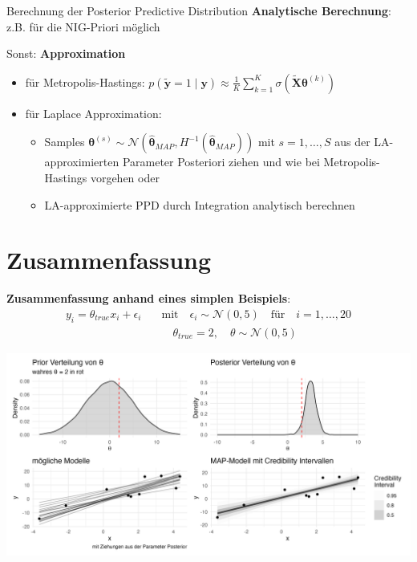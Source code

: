 \documentclass[
  ignorenonframetext,
  aspectratio=169,
]{beamer}
\providecommand{\tightlist}{%
  \setlength{\itemsep}{0pt}\setlength{\parskip}{0pt}}
\newcommand{\by}{\bm{y}}
\newcommand{\Ncal}{\mathcal{N}}
\newcommand{\btheta}{\bm{\theta}}
\newcommand{\hbtheta}{\hat{\bm{\theta}}}
\newcommand{\ty}{\tilde{\bm{y}}}
\newcommand{\tX}{\tilde{\bm{X}}}
\begin{document}
\begin{frame}{Berechnung der Posterior Predictive Distribution}
\protect{}\label{berechnung-der-posterior-predictive-distribution}
\textbf{Analytische Berechnung}: z.B. für die NIG-Priori möglich

Sonst: \textbf{Approximation}

\begin{itemize}
\tightlist
\item
  für Metropolis-Hastings:
  \(p(\ty = 1 \mid \by) \approx \frac{1}{K} \sum_{k=1}^{K} \sigma(\tX \btheta^{(k)})\)
\item
  für Laplace Approximation:

  \begin{itemize}
  \tightlist
  \item
    Samples
    \(\btheta^{(s)} \sim \Ncal(\hbtheta_{MAP}, H^{-1}(\hbtheta_{MAP}))\)
    mit \(s = 1, \dots, S\) aus der LA-approximierten Parameter
    Posteriori ziehen und wie bei Metropolis-Hastings vorgehen oder
  \item
    LA-approximierte PPD durch Integration analytisch berechnen
  \end{itemize}
\end{itemize}
\end{frame}

\section{Zusammenfassung}\label{zusammenfassung}

\begin{frame}
\textbf{Zusammenfassung anhand eines simplen Beispiels}: \[
\begin{aligned}
y_i = \theta_{true} x_i + \epsilon_i\quad &\text{mit} \quad\epsilon_i \sim \Ncal(0, 5) \quad \text{für} \quad i = 1, \dots, 20 \\
&\quad \theta_{true} = 2, \quad \theta \sim \Ncal(0, 5)
\end{aligned}
\]
\end{frame}

\begin{frame}
\includegraphics[width=\linewidth,height=0.8\textheight,keepaspectratio]{../figures/plot_example.png}
\end{frame}
\end{document}
